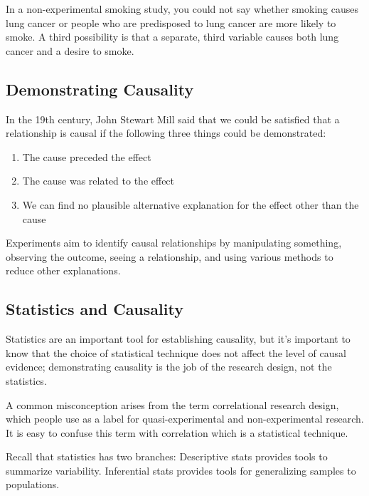 \documentclass[
]{book}
\providecommand{\tightlist}{%
  \setlength{\itemsep}{0pt}\setlength{\parskip}{0pt}}
\begin{document}
In a non-experimental smoking study, you could not say whether smoking causes lung cancer or people who are predisposed to lung cancer are more likely to smoke. A third possibility is that a separate, third variable causes both lung cancer and a desire to smoke.

\hypertarget{demonstrating-causality}{%
\subsection{Demonstrating Causality}\label{demonstrating-causality}}

In the 19th century, John Stewart Mill said that we could be satisfied that a relationship is causal if the following three things could be demonstrated:

\begin{enumerate}
\def\labelenumi{\arabic{enumi}.}
\tightlist
\item
  The cause preceded the effect
\item
  The cause was related to the effect
\item
  We can find no plausible alternative explanation for the effect other than the cause
\end{enumerate}

Experiments aim to identify causal relationships by manipulating something, observing the outcome, seeing a relationship, and using various methods to reduce other explanations.

\hypertarget{statistics-and-causality}{%
\subsection{Statistics and Causality}\label{statistics-and-causality}}

Statistics are an important tool for establishing causality, but it's important to know that the choice of statistical technique does not affect the level of causal evidence; demonstrating causality is the job of the research design, not the statistics.

A common misconception arises from the term correlational research design, which people use as a label for quasi-experimental and non-experimental research. It is easy to confuse this term with correlation which is a statistical technique.

Recall that statistics has two branches: Descriptive stats provides tools to summarize variability. Inferential stats provides tools for generalizing samples to populations.
\end{document}
